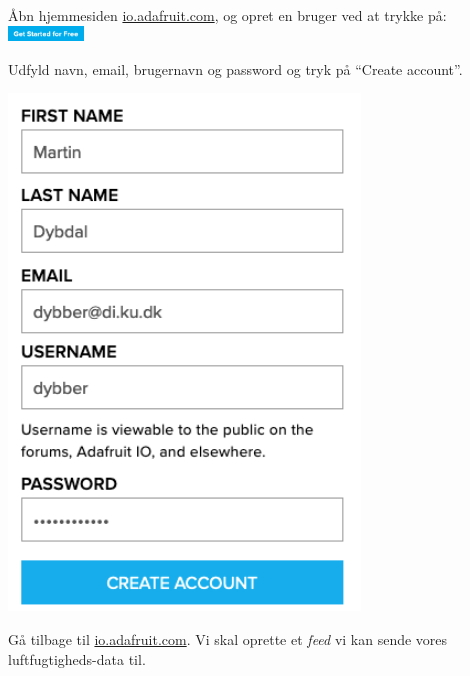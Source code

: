 \documentclass{ucph-handout}
\newcounter{handout}
\newcommand{\Ark}{Arbejdsark \arabic{handout}: }
\renewcommand{\Title}{\Ark LED-strip}%
\begin{document}
\renewcommand{\Title}{\Ark Få måleren online}
\begin{exercisebox}[adjusted title=Oprettelse på Adafruit]
  \begin{minipage}{0.7\linewidth}
    Åbn hjemmesiden \url{io.adafruit.com}, og opret en bruger ved at trykke på:\\
    
    \quad\includegraphics[width=2cm]{illustrationer/adafruit_createaccount1}

  \vspace{3mm}
  Udfyld navn, email, brugernavn og password og tryk på "`Create
  account"'.

\end{minipage}
\begin{minipage}{0.29\linewidth}
  \begin{center}
\includegraphics[width=0.7\textwidth]{illustrationer/adafruit_createaccount2}
\end{center}
\end{minipage}

 Gå tilbage til \url{io.adafruit.com}. Vi skal
oprette et \textit{feed} vi kan sende vores luftfugtigheds-data til.


\end{exercisebox}
\end{document}
